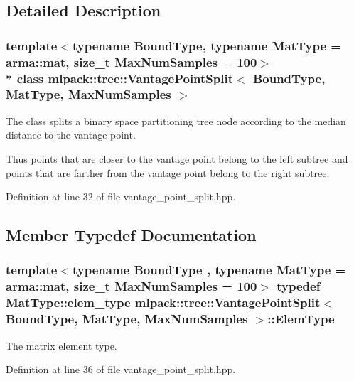 \subsection{Detailed Description}
\subsubsection*{template$<$typename Bound\+Type, typename Mat\+Type = arma\+::mat, size\+\_\+t Max\+Num\+Samples = 100$>$\\*
class mlpack\+::tree\+::\+Vantage\+Point\+Split$<$ Bound\+Type, Mat\+Type, Max\+Num\+Samples $>$}

The class splits a binary space partitioning tree node according to the median distance to the vantage point. 

Thus points that are closer to the vantage point belong to the left subtree and points that are farther from the vantage point belong to the right subtree. 

Definition at line 32 of file vantage\+\_\+point\+\_\+split.\+hpp.



\subsection{Member Typedef Documentation}
\subsubsection[{Elem\+Type}]{\setlength{\rightskip}{0pt plus 5cm}template$<$typename Bound\+Type , typename Mat\+Type  = arma\+::mat, size\+\_\+t Max\+Num\+Samples = 100$>$ typedef Mat\+Type\+::elem\+\_\+type {\bf mlpack\+::tree\+::\+Vantage\+Point\+Split}$<$ Bound\+Type, Mat\+Type, Max\+Num\+Samples $>$\+::{\bf Elem\+Type}}\label{classmlpack_1_1tree_1_1VantagePointSplit_aed3184a8be607b48b4877c7cc90363de}


The matrix element type. 



Definition at line 36 of file vantage\+\_\+point\+\_\+split.\+hpp.

